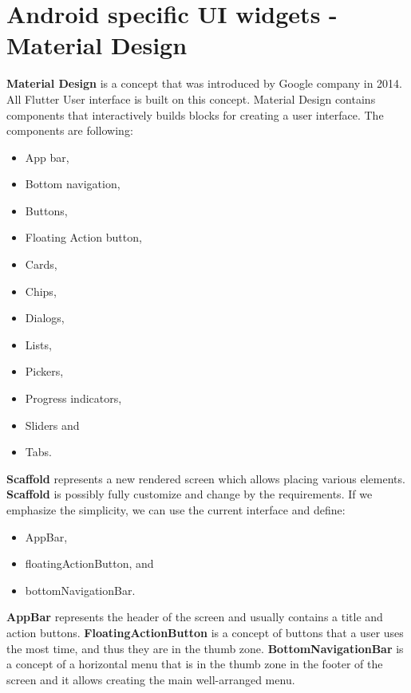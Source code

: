 \section{Android specific UI widgets - Material Design}\label{sec:android-specific-ui-widgets}
\textbf{Material Design} is a concept that was introduced by Google company in 2014.\cite{materialDesignArticle}
All Flutter User interface is built on this concept.
Material Design contains components that interactively builds blocks for creating a user interface.
The components are following:
\begin{itemize}
    \item App bar,
    \item Bottom navigation,
    \item Buttons,
    \item Floating Action button,
    \item Cards,
    \item Chips,
    \item Dialogs,
    \item Lists,
    \item Pickers,
    \item Progress indicators,
    \item Sliders and
    \item Tabs.\cite{materialDesign}
\end{itemize}

\textbf{Scaffold} represents a new rendered screen which allows placing various elements.
\textbf{Scaffold} is possibly fully customize and change by the requirements.
If we emphasize the simplicity, we can use the current interface and define:
\begin{itemize}
    \item AppBar,
    \item floatingActionButton, and
    \item bottomNavigationBar.
\end{itemize}
\textbf{AppBar} represents the header of the screen and usually contains a title and action buttons.
\textbf{FloatingActionButton} is a concept of buttons that a user uses the most time, and thus they are in the thumb zone.
\textbf{BottomNavigationBar} is a concept of a horizontal menu that is in the thumb zone in the footer of the screen and it allows creating the main well-arranged menu.
